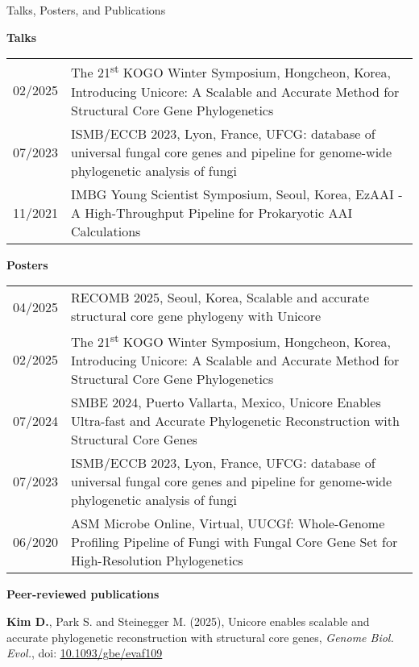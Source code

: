 \documentclass{resume} %
\newcommand{\uhref}[2]{\href{#1}{\uline{#2}}}
\newcommand{\doi}[1]{\uhref{https://doi.org/#1}{#1}}
\newcommand{\subheading}[1]{%
  \vspace{0.5mm}%
  {\fontsize{11.5pt}{13pt}\selectfont\bfseries #1}%
  \vspace{1mm}%
}
\begin{document}
\begin{rSection}{Talks, Posters, and Publications}
\vspace{1mm}

\subheading{Talks}

\begin{tabular}{p{2.5cm}p{14.1cm}}
02/2025 & The 21\textsuperscript{st} KOGO Winter Symposium, Hongcheon, Korea, Introducing Unicore: A Scalable and Accurate Method for Structural Core Gene Phylogenetics
\\[1mm]
07/2023 & ISMB/ECCB 2023, Lyon, France, UFCG: database of universal fungal core genes and pipeline for genome-wide phylogenetic analysis of fungi
\\[1mm]
11/2021 & IMBG Young Scientist Symposium, Seoul, Korea, EzAAI - A High-Throughput Pipeline for Prokaryotic AAI Calculations
\\[1mm]
\end{tabular}
\vspace{1mm}

\subheading{Posters}

\begin{tabular}{p{2.5cm}p{14.1cm}}
04/2025 & RECOMB 2025, Seoul, Korea, Scalable and accurate structural core gene phylogeny with Unicore
\\[1mm]
02/2025 & The 21\textsuperscript{st} KOGO Winter Symposium, Hongcheon, Korea, Introducing Unicore: A Scalable and Accurate Method for Structural Core Gene Phylogenetics
\\[1mm]
07/2024 & SMBE 2024, Puerto Vallarta, Mexico, Unicore Enables Ultra-fast and Accurate Phylogenetic Reconstruction with Structural Core Genes
\\[1mm]
07/2023 & ISMB/ECCB 2023, Lyon, France, UFCG: database of universal fungal core genes and pipeline for genome-wide phylogenetic analysis of fungi
\\[1mm]
06/2020 & ASM Microbe Online, Virtual, UUCGf: Whole-Genome Profiling Pipeline of Fungi with Fungal Core Gene Set for High-Resolution Phylogenetics
\end{tabular}
\vspace{4mm}

\subheading{Peer-reviewed publications}\\[-26mm]

\begin{thebibliography}{10}

\vspace{8mm}

{\bf Kim D.}, Park S. and Steinegger M. (2025),
Unicore enables scalable and accurate phylogenetic reconstruction with structural core genes, {\em Genome Biol. Evol.}, doi: \doi{10.1093/gbe/evaf109}


\end{thebibliography}
\end{rSection}
\end{document}
